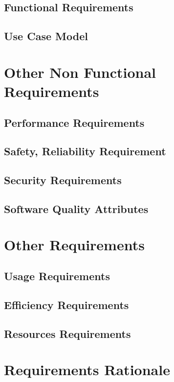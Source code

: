 \documentclass{report}
\begin{document}
		\section{Functional Requirements}
		\section{Use Case Model}
	\chapter{Other Non Functional Requirements}
		\section{Performance Requirements}
		\section{Safety, Reliability Requirement}
		\section{Security Requirements}
		\section{Software Quality Attributes}
	\chapter{Other Requirements}
		\section{Usage Requirements}
		\section{Efficiency Requirements}
		\section{Resources Requirements}
	\chapter{Requirements Rationale}
\end{document}
